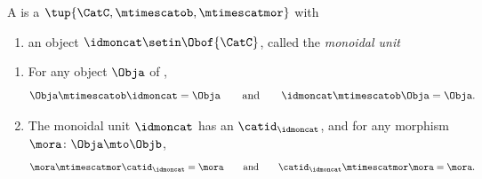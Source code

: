 \begin{ctdefinition}
    \label{def:strict-monoidal-stacking-semicat}
    A  is a  $\tup{\CatC, \mtimescatob, \mtimescatmor}$ with

    \constit

    \begin{enumerate}
        \item an object $\idmoncat \setin \Obof{\CatC}$, called the \emph{monoidal unit}
    \end{enumerate}

    \condit

    \begin{enumerate}
        \item For any object $\Obja$ of \CatC,
              \begin{equation}\label{eq:strict-mon-stacking-semicat-cond1}
                  \Obja \mtimescatob \idmoncat = \Obja \qquad \text{and} \qquad \idmoncat \mtimescatob \Obja = \Obja.
              \end{equation}
        \item The monoidal unit $\idmoncat$ has an  $\catid_\idmoncat$, and for any morphism $\mora \colon \Obja \mto \Objb$,
              \begin{equation}\label{eq:strict-mon-stacking-semicat-cond2}
                  \mora \mtimescatmor \catid_\idmoncat = \mora \qquad \text{and} \qquad \catid_\idmoncat \mtimescatmor  \mora = \mora.
              \end{equation}
    \end{enumerate}
\end{ctdefinition}


